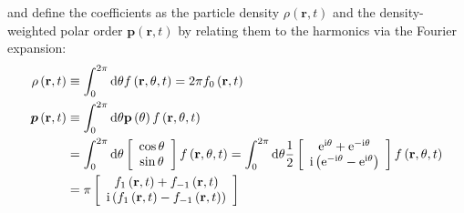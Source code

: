 \documentclass[10pt,aspectratio=43,mathserif,table]{beamer}
\begin{document}
\begin{frame}
    \small
    and define the coefficients  as the particle density $ \rho\left(\mathbf{r}, t\right)$ and the density-weighted polar order $\boldsymbol{p}\left(\mathbf{r}, t\right)$ by relating them to the harmonics via the Fourier expansion:
    \begin{subequations}
        \begin{align}
            \rho \left( \mathbf{r},t \right) &\equiv \int_0^{2\pi}{\mathrm{d}\theta f\left( \mathbf{r},\theta ,t \right)}=2\pi f_{0}\left( \mathbf{r},t \right)
            \label{eq:particleDensity}
            \\
            \boldsymbol{p}\left( \mathbf{r},t \right) &\equiv \int_0^{2\pi}{\mathrm{d}\theta \mathbf{p}\left( \theta \right) f\left( \mathbf{r},\theta ,t \right)}\notag\\
            &=\int_0^{2\pi}{\mathrm{d}\theta \left[ \begin{array}{c}
            \cos \theta\\
            \sin \theta\\
        \end{array} \right] f\left( \mathbf{r},\theta ,t \right)}=\int_0^{2\pi}{\mathrm{d}\theta \frac{1}{2}\left[ \begin{array}{c}
            \mathrm{e}^{\mathrm{i}\theta}+\mathrm{e}^{-\mathrm{i}\theta}\\
            \mathrm{i}\left( \mathrm{e}^{-\mathrm{i}\theta}-\mathrm{e}^{\mathrm{i}\theta} \right)\\
        \end{array} \right] f\left( \mathbf{r},\theta ,t \right)}\notag\\
            &=\pi \left[ \begin{array}{c}
            f_{1}\left( \mathbf{r},t \right) +f_{-1}\left( \mathbf{r},t \right)\\
            \mathrm{i}\left( f_{1}\left( \mathbf{r},t \right) -f_{-1}\left( \mathbf{r},t \right) \right)\\
        \end{array} \right]
        \label{eq:polarOrder}
        \end{align}
    \end{subequations}
\end{frame}
\end{document}
